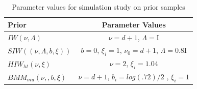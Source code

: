 \documentclass[a4paper]{article}
\newcommand{\I}{\mathrm{I}}
\begin{document}

\begin{table}[htbp]
   \centering
    \caption{ Parameter values for simulation study on prior samples}
   \label{paramvals} 
   \begin{tabular}{ l|c}
   \hline
      Prior    &  Parameter Values \\ \hline
  $IW(\nu, \Lambda)$ &   $\nu=d+1$, $\Lambda=\I$ \\ 
  $SIW((\nu, \Lambda, b, \xi))$  & $b=0$, $\xi_i =1$,  $\nu_0= d + 1$, $\Lambda = 0.8\I$ \\
  $HIW_{ht}(\nu, \xi)$    &  $\nu=2$,  $\xi_i=1.04$ \\
   $BMM_{mu}(\nu,,b,\xi)$   &  $\nu=d+1$, $b_i=log(.72)/2$ , $\xi_i=1$ \\ \hline
   \end{tabular}
 \end{table}       
\end{document}
